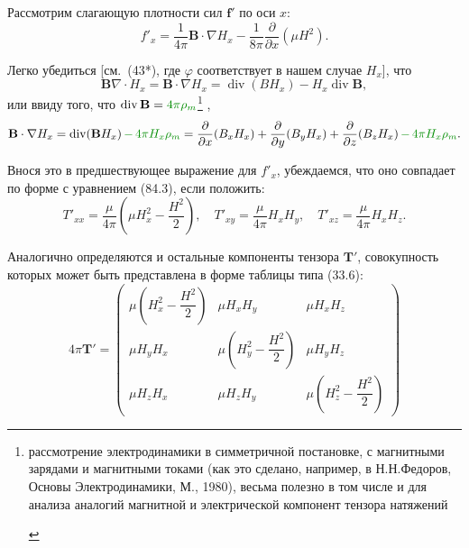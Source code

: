 \documentclass[a4paper,10pt]{article}
\newcommand{\modmath}[1]{\textcolor{modcolor}{#1}}
\newcommand{\modblock}[1]{\colorbox{modcolor!10}{\parbox{\dimexpr\linewidth-2\fboxsep}{#1}}}
\begin{document}
Рассмотрим слагающую плотности сил $\mathbf{f}'$ по оси $x$:
$$
    f'_x = \frac{1}{4\pi}\mathbf{B}\cdot\nabla H_x
         - \frac{1}{8\pi}\frac{\partial}{\partial x}(\mu H^2).
$$

Легко убедиться [см.\ (43*), где $\varphi$ соответствует в нашем случае
$H_x$], что
$$
    \mathbf{B}\nabla\cdot H_x = \mathbf{B}\cdot\nabla H_x
    = \operatorname{div}(BH_x) - H_x\operatorname{div}\mathbf{B},
$$
или ввиду того, что $\operatorname{div}\mathbf{B} = \modmath{4\pi\rho_m}$\footnote{
\modblock{
рассмотрение электродинамики в симметричной постановке, с магнитными зарядами и магнитными токами (как это сделано, например, в Н.Н.Федоров, Основы Электродинамики, М., 1980), весьма полезно в том числе и для анализа аналогий магнитной и электрической компонент тензора натяжений
}%
}%
,
$$
    \mathbf{B}\cdot\nabla H_x
    = \operatorname{div}(\mathbf{B}H_x) \modmath{\,-\, 4\pi H_x\rho_m}
    = \frac{\partial}{\partial x}(B_x H_x)
    + \frac{\partial}{\partial y}(B_y H_x)
    + \frac{\partial}{\partial z}(B_z H_x) \modmath{\,-\, 4\pi H_x\rho_m}.
$$

Внося это в предшествующее выражение для $f'_x$, убеждаемся, что
оно совпадает по форме с уравнением (84.3), если положить:
$$
    T'_{xx} = \frac{\mu}{4\pi}\!\left(\mu H_x^2 - \frac{H^2}{2}\right),
    \quad
    T'_{xy} = \frac{\mu}{4\pi}H_x H_y,
    \quad
    T'_{xz} = \frac{\mu}{4\pi}H_x H_z.
$$

Аналогично определяются и остальные компоненты тензора $\mathbf{T}'$,
совокупность которых может быть представлена в форме таблицы типа (33.6):
\begin{equation}
    4\pi\mathbf{T}' = \begin{pmatrix}
        \mu\!\left(H_x^2 - \dfrac{H^2}{2}\right) & \mu H_x H_y & \mu H_x H_z \\
        \mu H_y H_x & \mu\!\left(H_y^2 - \dfrac{H^2}{2}\right) & \mu H_y H_z \\
        \mu H_z H_x & \mu H_z H_y & \mu\!\left(H_z^2 - \dfrac{H^2}{2}\right)
    \end{pmatrix}
    \tag{84.4}
\end{equation}

\end{document}
